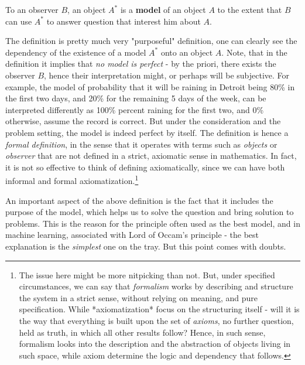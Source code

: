 \begin{definition}[Model]
    To an observer $B$, an object $A^{*}$ is a \textbf{model} of an object $A$ to the extent that $B$ can use $A^{*}$ to answer question that interest him about $A$. 
\end{definition}

The definition is pretty much very "purposeful" definition, one can clearly see the dependency of the existence of a model $A^{*}$ onto an object $A$. Note, that in the definition it implies that \textit{no model is perfect} - by the priori, there exists the observer $B$, hence their interpretation might, or perhaps will be subjective. For example, the model of probability that it will be raining in Detroit being 80\% in the first two days, and 20\% for the remaining 5 days of the week, can be interpreted differently as 100\% percent raining for the first two, and 0\% otherwise, assume the record is correct. But under the consideration and the problem setting, the model is indeed perfect by itself. The definition is hence a \textit{formal definition}, in the sense that it operates with terms such as \textit{objects} or \textit{observer} that are not defined in a strict, axiomatic sense in mathematics. In fact, it is not so effective to think of defining axiomatically, since we can have both informal and formal axiomatization.\footnote{The issue here might be more nitpicking than not. But, under specified circumstances, we can say that \textit{formalism} works by describing and structure the system in a strict sense, without relying on meaning, and pure specification. While *axiomatization* focus on the structuring itself - will it is the way that everything is built upon the set of \textit{axioms}, no further question, held as truth, in which all other results follow? Hence, in such sense, formalism looks into the description and the abstraction of objects living in such space, while axiom determine the logic and dependency that follows. }

An important aspect of the above definition is the fact that it includes the purpose of the model, which helps us to solve the question and bring solution to problems. This is the reason for the principle often used as the best model, and in machine learning, associated with Lord of Occam's principle - the best explanation is the \textit{simplest} one on the tray. But this point comes with doubts. 

